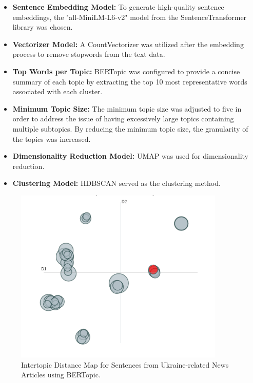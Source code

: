 \documentclass[12pt,oneside,bibtotoc,liststotoc]{scrbook}
\begin{document}
\begin{itemize}
    \item \textbf{Sentence Embedding Model:} To generate high-quality sentence embeddings, the "all-MiniLM-L6-v2" model from the SentenceTransformer library was chosen.

    \item \textbf{Vectorizer Model:} A CountVectorizer was utilized after the embedding process to remove stopwords from the text data.

    \item \textbf{Top Words per Topic:} BERTopic was configured to provide a concise summary of each topic by extracting the top 10 most representative words associated with each cluster.

    \item \textbf{Minimum Topic Size:} The minimum topic size was adjusted to five in order to address the issue of having excessively large topics containing multiple subtopics. By reducing the minimum topic size, the granularity of the topics was increased.

    \item \textbf{Dimensionality Reduction Model:} UMAP was used for dimensionality reduction.

    \item \textbf{Clustering Model:} HDBSCAN served as the clustering method.
\end{itemize}

\begin{figure}
  \centering
  \includegraphics[width=10cm]{img/intertopic_distance_map.png}
  \caption{Intertopic Distance Map for Sentences from Ukraine-related News Articles using BERTopic.}
  \label{fig:intertopic_distance_map}
\end{figure}
\end{document}
